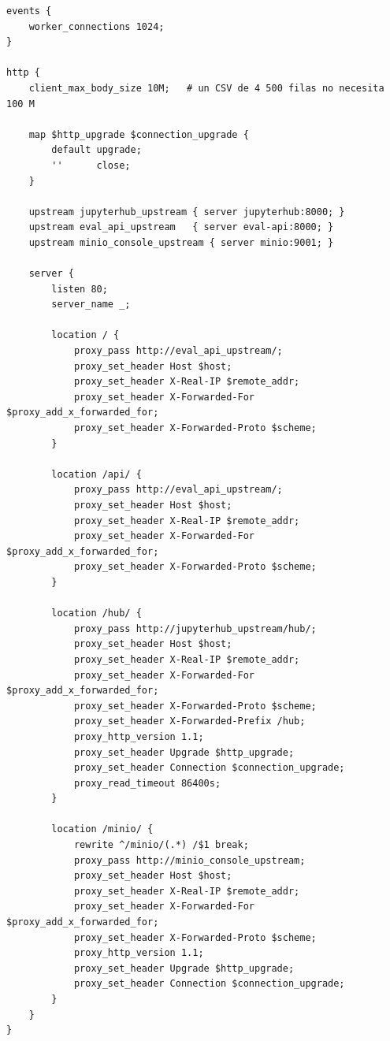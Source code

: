 \documentclass[11pt,a4paper]{article}
\begin{document}
\begin{lstlisting}
events {
    worker_connections 1024;
}

http {
    client_max_body_size 10M;   # un CSV de 4 500 filas no necesita 100 M

    map $http_upgrade $connection_upgrade {
        default upgrade;
        ''      close;
    }

    upstream jupyterhub_upstream { server jupyterhub:8000; }
    upstream eval_api_upstream   { server eval-api:8000; }
    upstream minio_console_upstream { server minio:9001; }

    server {
        listen 80;
        server_name _;

        location / {
            proxy_pass http://eval_api_upstream/;
            proxy_set_header Host $host;
            proxy_set_header X-Real-IP $remote_addr;
            proxy_set_header X-Forwarded-For $proxy_add_x_forwarded_for;
            proxy_set_header X-Forwarded-Proto $scheme;
        }

        location /api/ {
            proxy_pass http://eval_api_upstream/;
            proxy_set_header Host $host;
            proxy_set_header X-Real-IP $remote_addr;
            proxy_set_header X-Forwarded-For $proxy_add_x_forwarded_for;
            proxy_set_header X-Forwarded-Proto $scheme;
        }

        location /hub/ {
            proxy_pass http://jupyterhub_upstream/hub/;
            proxy_set_header Host $host;
            proxy_set_header X-Real-IP $remote_addr;
            proxy_set_header X-Forwarded-For $proxy_add_x_forwarded_for;
            proxy_set_header X-Forwarded-Proto $scheme;
            proxy_set_header X-Forwarded-Prefix /hub;
            proxy_http_version 1.1;
            proxy_set_header Upgrade $http_upgrade;
            proxy_set_header Connection $connection_upgrade;
            proxy_read_timeout 86400s;
        }

        location /minio/ {
            rewrite ^/minio/(.*) /$1 break;
            proxy_pass http://minio_console_upstream;
            proxy_set_header Host $host;
            proxy_set_header X-Real-IP $remote_addr;
            proxy_set_header X-Forwarded-For $proxy_add_x_forwarded_for;
            proxy_set_header X-Forwarded-Proto $scheme;
            proxy_http_version 1.1;
            proxy_set_header Upgrade $http_upgrade;
            proxy_set_header Connection $connection_upgrade;
        }
    }
}
\end{lstlisting}
\end{document}
